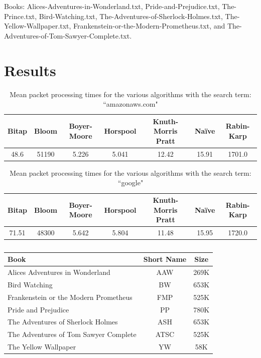 \documentclass{article}
\begin{document}
Books: Alices-Adventures-in-Wonderland.txt, Pride-and-Prejudice.txt, The-Prince.txt, Bird-Watching.txt, The-Adventures-of-Sherlock-Holmes.txt, The-Yellow-Wallpaper.txt, Frankenstein-or-the-Modern-Prometheus.txt, and The-Adventures-of-Tom-Sawyer-Complete.txt.

\section{Results} \label{sec:results}

\begin{table}[hbt]
  \centering
  \begin{tabular}{ccccccc}
    Bitap & Bloom & Boyer-Moore & Horspool & Knuth-Morris Pratt & Na{\"i}ve & Rabin-Karp \\
    \hline
    48.6 & 51190 & 5.226 & 5.041 & 12.42 & 15.91 & 1701.0
  \end{tabular}
  \caption{Mean packet processing times for the various algorithms with the search term: ``amazonaws.com"}
  \label{table:packet-amazonaws-mean}
\end{table}

\begin{table}[hbt]
  \centering
  \begin{tabular}{ccccccc}
    Bitap & Bloom & Boyer-Moore & Horspool & Knuth-Morris Pratt & Na{\"i}ve & Rabin-Karp \\
    \hline
    71.51 & 48300 & 5.642 & 5.804 & 11.48 & 15.95 & 1720.0
  \end{tabular}
  \caption{Mean packet processing times for the various algorithms with the search term: ``google"}
  \label{table:packet-google-mean}
\end{table}

\begin{table}[hbt]
  \centering
  \begin{tabular}{l|cc}
    Book & Short Name & Size\\
    \hline
    Alices Adventures in Wonderland & AAW & 269K \\
    Bird Watching & BW & 653K \\
    Frankenstein or the Modern Prometheus & FMP & 525K \\
    Pride and Prejudice & PP & 780K \\
    The Adventures of Sherlock Holmes & ASH & 653K \\
    The Adventures of Tom Sawyer Complete & ATSC & 525K \\
    The Yellow Wallpaper & YW & 58K
  \end{tabular}
  \caption{}
\end{table}
\end{document}
